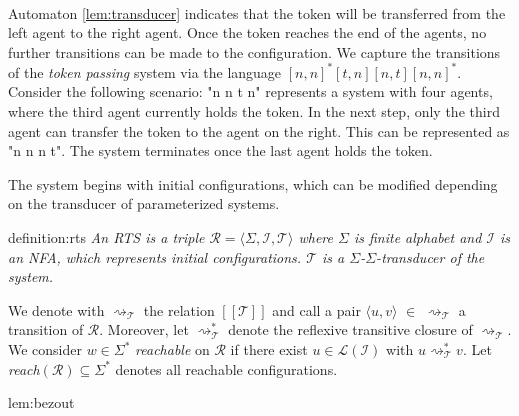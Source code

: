\paragraph*{}
Automaton \ref{lem:transducer} indicates that the token will be transferred from the left agent to the right agent. 
Once the token reaches the end of the agents, no further transitions can be made to the configuration.
We capture the transitions of the \textit{token passing} system via the language 
$[n,n]^*[t,n][n,t][n,n]^*$.
Consider the following scenario: "n n t n" represents a system with four agents, 
where the third agent currently holds the token. In the next step, 
only the third agent can transfer the token to the agent on the right. 
This can be represented as "n n n t". The system terminates once the last agent 
holds the token.

The system begins with initial configurations, which can be modified depending on the transducer of parameterized systems.
\begin{theo}{definition:rts}
    \textit{
    An RTS is a triple $\mathcal{R} = \langle \Sigma, \mathcal{I}, \mathcal{T} \rangle$ where $\Sigma$
    is finite alphabet and $\mathcal{I}$ is an NFA, which represents initial configurations.
    $\mathcal{T}$ is a $\Sigma$-$\Sigma$-\textit{transducer} of the system.
    }
\end{theo}

We denote with $\rightsquigarrow_\mathcal{T}$ the relation $[[\mathcal{T}]]$ and call
a pair $\langle u, v \rangle$ $\in$ $\rightsquigarrow_\mathcal{T}$ a transition of $\mathcal{R}$.
Moreover, let $\rightsquigarrow_\mathcal{T}^{*}$ denote the reflexive
transitive closure of $\rightsquigarrow_\mathcal{T}$.
We consider $w \in \Sigma^*$ \textit{reachable} on $\mathcal{R}$
if there exist $u \in \mathcal{L}(\mathcal{I})$ with $u \rightsquigarrow_\mathcal{T}^{*} v$.
Let \textit{reach}$(\mathcal{R}) \subseteq \Sigma^*$ denotes all
reachable configurations.
\begin{lem}{lem:bezout}
\end{lem}

